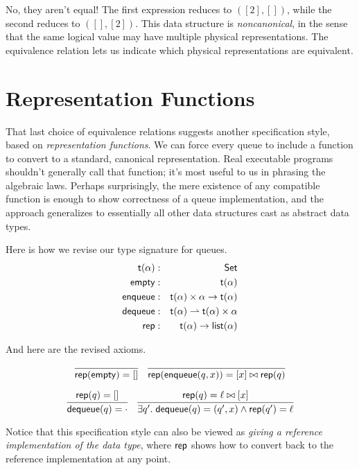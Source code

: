\documentclass{amsbook}
\theoremstyle{definition}
\theoremstyle{remark}
\numberwithin{section}{chapter}
\numberwithin{equation}{chapter}
\begin{document}
No, they aren't equal!  The first expression reduces to $([2], [])$, while the second reduces to $([], [2])$.
This data structure is \emph{noncanonical}, in the sense that the same logical value may have multiple physical representations.
The equivalence relation lets us indicate which physical representations are equivalent.

\section{Representation Functions}

That last choice of equivalence relations suggests another specification style, based on \emph{representation functions}.
We can force every queue to include a function to convert to a standard, canonical representation.
Real executable programs shouldn't generally call that function; it's most useful to us in phrasing the algebraic laws.
Perhaps surprisingly, the mere existence of any compatible function is enough to show correctness of a queue implementation, and the approach generalizes to essentially all other data structures cast as abstract data types.

Here is how we revise our type signature for queues.
\begin{eqnarray*}
  \mathsf{t}(\alpha) &:& \mathsf{Set} \\
  \mathsf{empty} &:& \mathsf{t}(\alpha) \\
  \mathsf{enqueue} &:& \mathsf{t}(\alpha) \times \alpha \to \mathsf{t}(\alpha) \\
  \mathsf{dequeue} &:& \mathsf{t}(\alpha) \rightharpoonup \mathsf{t}(\alpha) \times \alpha \\
  \mathsf{rep} &:& \mathsf{t}(\alpha) \to \mathsf{list}(\alpha)
\end{eqnarray*}

And here are the revised axioms.

$$\infer{\mt{rep}(\mt{empty}) = []}{}
\quad \infer{\mt{rep}(\mt{enqueue}(q, x)) = \concat{[x]}{\mt{rep}(q)}}{}$$

$$\infer{\mt{dequeue}(q) = \cdot}{\mt{rep}(q) = []}
\quad \infer{\exists q'. \; \mt{dequeue}(q) = (q', x) \land \mt{rep}(q') = \ell}{\mt{rep}(q) = \concat{\ell}{[x]}}$$

Notice that this specification style can also be viewed as \emph{giving a reference implementation of the data type}, where $\mathsf{rep}$ shows how to convert back to the reference implementation at any point.
\end{document}
